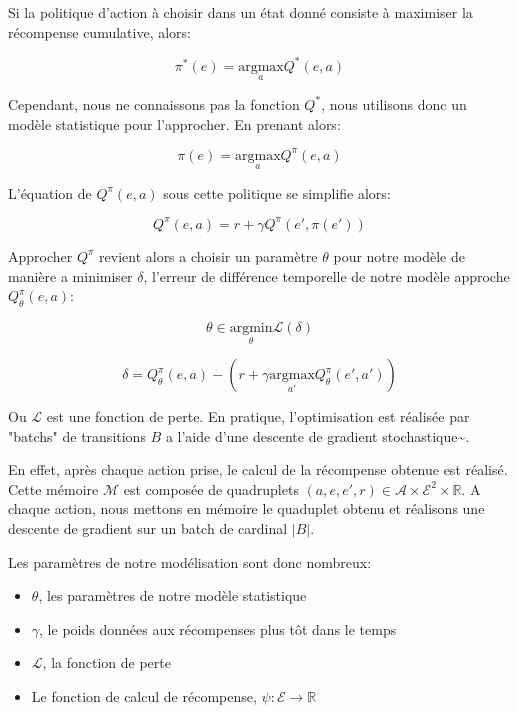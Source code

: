 \documentclass[11pt]{article}
\begin{document}
Si la politique d'action à choisir dans un état donné consiste à maximiser la
récompense cumulative, alors:

\begin{latex}
\[
\pi^*(e) = \underset{a}{\mathrm{argmax}} Q^*(e, a)
\]
\end{latex}

Cependant, nous ne connaissons pas la fonction \(Q^*\), nous utilisons donc un
modèle statistique pour l'approcher. En prenant alors:

\begin{latex}
\[
\pi(e) = \underset{a}{\mathrm{argmax}} Q^\pi(e, a)
\]
\end{latex}


L'équation de \(Q^\pi(e,a)\) sous cette politique se simplifie alors:

\begin{latex}
\[
Q^\pi(e,a) = r + \gamma Q^\pi(e', \pi(e'))
\]
\end{latex}

Approcher \(Q^\pi\) revient alors a choisir un paramètre \(\theta\) pour notre modèle de manière a minimiser \(\delta\), l'erreur de différence temporelle de notre modèle approche \(Q_\theta^\pi(e,a)\):


\begin{latex}
\[
\theta \in \underset{\theta}{\mathrm{argmin}} \mathcal{L}(\delta) 
\]

\[
\delta = Q^\pi_\theta(e,a) - (r + \gamma\underset{a'}{\mathrm{argmax}} Q^\pi_\theta(e', a'))
\]
\end{latex}

Ou \(\mathcal{L}\) est une fonction de perte. En pratique, l'optimisation est réalisée par "batchs" de transitions \(B\) a l'aide d'une descente de gradient stochastique\textasciitilde{}\cite{GaoSLIS17}. 

En effet, après chaque action prise, le calcul de la récompense obtenue est
réalisé. Cette mémoire \(\mathcal{M}\) est composée de quadruplets \((a, e, e', r) \in \mathcal{A}\times\mathcal{E}^2\times\mathbb{R}\). A chaque action, nous mettons en mémoire le quaduplet obtenu et réalisons une descente de gradient sur un batch de
cardinal \(|B|\).

Les paramètres de notre modélisation sont donc nombreux:

\begin{itemize}
\item \(\theta\), les paramètres de notre modèle statistique
\item \(\gamma\), le poids données aux récompenses plus tôt dans le temps
\item \(\mathcal{L}\), la fonction de perte
\item Le fonction de calcul de récompense, \(\psi : \mathcal{E} \longrightarrow \mathbb{R}\)
\end{itemize}
\end{document}
